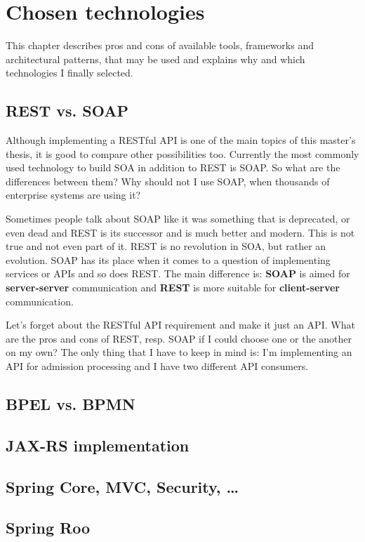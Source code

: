 \chapter{Chosen technologies}\label{technologies}

	This chapter describes pros and cons of available tools, frameworks and architectural patterns, that may be used and
	explains why and which technologies I finally selected.

	\section{REST vs. SOAP}
	
	Although implementing a RESTful API is one of the main topics of this master's thesis, it is good to compare other
	possibilities too. Currently the most commonly used technology to build SOA in addition to REST is SOAP. So what are
	the differences between them? Why should not I use SOAP, when thousands of enterprise systems are using it?
	
	Sometimes people talk about SOAP like it was something that is deprecated, or even dead and REST is its successor and
	is much better and modern. This is not true and not even part of it. REST is no revolution in SOA, but rather
	an evolution. SOAP has its place when it comes to a question of implementing services or APIs and so does REST. The
	main difference is: \textbf{SOAP} is aimed for \textbf{server-server} communication and \textbf{REST} is more suitable
	for \textbf{client-server} communication.
	
	Let's forget about the RESTful API requirement and make it just an API. What are the pros and cons of REST, resp. SOAP
	if I could choose one or the another on my own? The only thing that I have to keep in mind is: I'm implementing an API
	for admission processing and I have two different API consumers.
	
	\section{BPEL vs. BPMN}
	
	\section{JAX-RS implementation}
	
	\section{Spring Core, MVC, Security, \ldots}
	
	\section{Spring Roo}